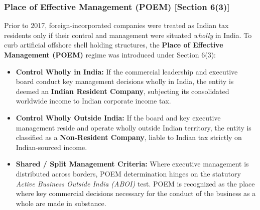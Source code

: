 \subsubsection{Place of Effective Management (POEM) [Section 6(3)]}
Prior to 2017, foreign-incorporated companies were treated as Indian tax residents only if their control and management were situated \textit{wholly} in India. To curb artificial offshore shell holding structures, the \textbf{Place of Effective Management (POEM)} regime was introduced under Section 6(3):
\begin{itemize}[leftmargin=1.5em]
    \item \textbf{Control Wholly in India:} If the commercial leadership and executive board conduct key management decisions wholly in India, the entity is deemed an \textbf{Indian Resident Company}, subjecting its consolidated worldwide income to Indian corporate income tax.
    \item \textbf{Control Wholly Outside India:} If the board and key executive management reside and operate wholly outside Indian territory, the entity is classified as a \textbf{Non-Resident Company}, liable to Indian tax strictly on Indian-sourced income.
    \item \textbf{Shared / Split Management Criteria:} Where executive management is distributed across borders, POEM determination hinges on the statutory \textit{Active Business Outside India (ABOI)} test. POEM is recognized as the place where key commercial decisions necessary for the conduct of the business as a whole are made in substance.
\end{itemize}

